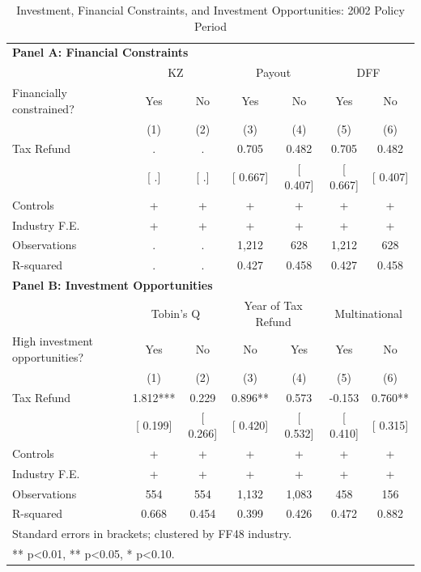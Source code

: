 \begin{table}[htbp]
\centering
\caption{Investment, Financial Constraints, and Investment Opportunities: 2002 Policy Period}
\begin{tabular}{lcccccc}
\hline\hline
\multicolumn{7}{l}{\textbf{Panel A: Financial Constraints}} \\
 & \multicolumn{2}{c}{KZ} & \multicolumn{2}{c}{Payout} & \multicolumn{2}{c}{DFF} \\
Financially constrained? & Yes & No & Yes & No & Yes & No \\
 & (1) & (2) & (3) & (4) & (5) & (6) \\
Tax Refund &         . &         . &     0.705 &     0.482 &     0.705 &     0.482 \\
 & [        .] & [        .] & [    0.667] & [    0.407] & [    0.667] & [    0.407] \\
Controls & + & + & + & + & + & + \\
Industry F.E. & + & + & + & + & + & + \\
Observations &            . &            . &        1,212 &          628 &        1,212 &          628 \\
R-squared &      . &      . &  0.427 &  0.458 &  0.427 &  0.458 \\
\hline
\multicolumn{7}{l}{\textbf{Panel B: Investment Opportunities}} \\
 & \multicolumn{2}{c}{Tobin's Q} & \multicolumn{2}{c}{Year of Tax Refund} & \multicolumn{2}{c}{Multinational} \\
High investment opportunities? & Yes & No & No & Yes & Yes & No \\
 & (1) & (2) & (3) & (4) & (5) & (6) \\
Tax Refund &     1.812*** &     0.229 &     0.896** &     0.573 &    -0.153 &     0.760** \\
 & [    0.199] & [    0.266] & [    0.420] & [    0.532] & [    0.410] & [    0.315] \\
Controls & + & + & + & + & + & + \\
Industry F.E. & + & + & + & + & + & + \\
Observations &          554 &          554 &        1,132 &        1,083 &          458 &          156 \\
R-squared &  0.668 &  0.454 &  0.399 &  0.426 &  0.472 &  0.882 \\
\hline\hline
\multicolumn{7}{l}{\footnotesize Standard errors in brackets; clustered by FF48 industry.} \\
\multicolumn{7}{l}{\footnotesize *** p<0.01, ** p<0.05, * p<0.10.} \\
\end{tabular}
\end{table}
